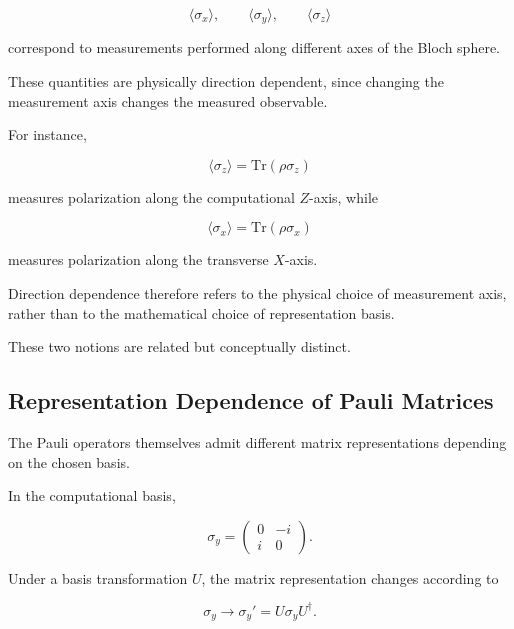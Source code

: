\[
\langle \sigma_x \rangle,
\qquad
\langle \sigma_y \rangle,
\qquad
\langle \sigma_z \rangle
\]

correspond to measurements performed along different axes of the Bloch sphere.

These quantities are physically direction dependent, since changing the measurement axis changes the measured observable.

\medskip

For instance,

\[
\langle \sigma_z \rangle
=
\mathrm{Tr}(\rho \sigma_z)
\]

measures polarization along the computational \( Z \)-axis, while

\[
\langle \sigma_x \rangle
=
\mathrm{Tr}(\rho \sigma_x)
\]

measures polarization along the transverse \( X \)-axis.

\medskip

Direction dependence therefore refers to the physical choice of measurement axis, rather than to the mathematical choice of representation basis.

These two notions are related but conceptually distinct.


\subsection*{Representation Dependence of Pauli Matrices}

The Pauli operators themselves admit different matrix representations depending on the chosen basis.

In the computational basis,

\begin{equation}
\sigma_y
=
\begin{pmatrix}
0 & -i \\
i & 0
\end{pmatrix}.
\label{eq:sigma_y_computational}
\end{equation}

Under a basis transformation \( U \), the matrix representation changes according to

\begin{equation}
\sigma_y
\rightarrow
\sigma_y'
=
U \sigma_y U^\dagger.
\label{eq:sigma_y_basis_change}
\end{equation}

